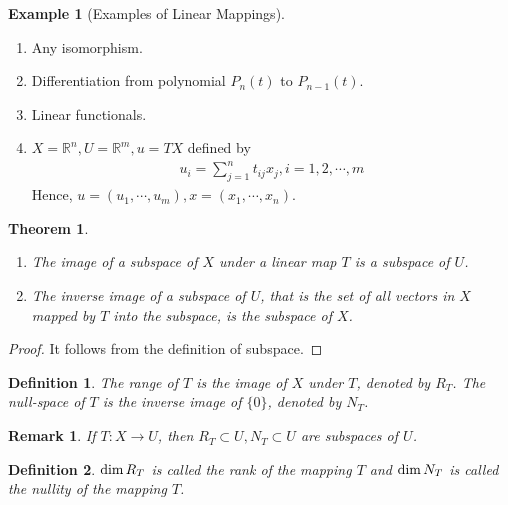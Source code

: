 \documentclass[11pt]{book}
\newtheorem{definition}{Definition}[section]
\newtheorem{theorem}{Theorem}[section]
\newtheorem{remark}{Remark}[section]
\theoremstyle{definition}
\newtheorem{example}{Example}[section]
\numberwithin{equation}{subsection}
\begin{document}
\medskip

\begin{example}[Examples of Linear Mappings]
~\begin{enumerate}[label=(\arabic*)]
    \item Any isomorphism.
    \item Differentiation from polynomial $P_n(t)$ to $P_{n-1}(t)$.
    \item Linear functionals.
    \item $X=\mathbb{R}^n, U=\mathbb{R}^m, u = TX$ defined by
    \begin{align*}
        u_i = \sum^n_{j=1}t_{ij}x_j, i = 1,2,\cdots,m
    \end{align*}
    Hence, $u = (u_1,\cdots,u_m), x = (x_1,\cdots,x_n)$.
\end{enumerate}
\end{example}

\medskip

\begin{theorem}
~\begin{enumerate}[label=(\arabic*)]
    \item The image of a subspace of $X$ under a linear map $T$ is a subspace of $U$.
    \item The inverse image of a subspace of $U$, that is the set of all vectors in $X$ mapped by $T$ into the subspace, is the subspace of $X$.
\end{enumerate}
\end{theorem}
\begin{proof}
It follows from the definition of subspace.
\end{proof}

\medskip

\begin{definition}
The range of $T$ is the image of $X$ under $T$, denoted by $R_T$. The null-space of $T$ is the inverse image of $\{0\}$, denoted by $N_T$.
\end{definition}
\begin{remark}
If $T:X\to U$, then $R_T\subset U, N_T\subset U$ are subspaces of $U$.
\end{remark}

\begin{definition}
${\rm dim}\,R_T$ is called the rank of the mapping $T$ and ${\rm dim}\,N_T$ is called the nullity of the mapping $T$.
\end{definition}

\medskip
\end{document}
